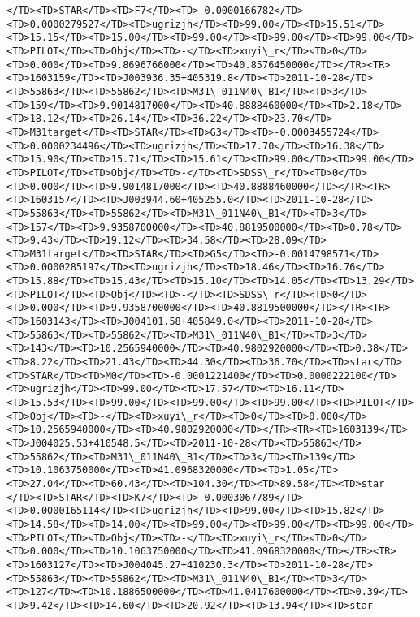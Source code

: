 \documentclass[11pt]{article}
\begin{document}
\begin{Verbatim}[commandchars=\\\{\}]
</TD><TD>STAR</TD><TD>F7</TD><TD>-0.0000166782</TD><TD>0.0000279527</TD><TD>ugrizjh</TD><TD>99.00</TD><TD>15.51</TD><TD>15.15</TD><TD>15.00</TD><TD>99.00</TD><TD>99.00</TD><TD>99.00</TD><TD>PILOT</TD><TD>Obj</TD><TD>-</TD><TD>xuyi\_r</TD><TD>0</TD><TD>0.000</TD><TD>9.8696766000</TD><TD>40.8576450000</TD></TR><TR><TD>1603159</TD><TD>J003936.35+405319.8</TD><TD>2011-10-28</TD><TD>55863</TD><TD>55862</TD><TD>M31\_011N40\_B1</TD><TD>3</TD><TD>159</TD><TD>9.9014817000</TD><TD>40.8888460000</TD><TD>2.18</TD><TD>18.12</TD><TD>26.14</TD><TD>36.22</TD><TD>23.70</TD><TD>M31target</TD><TD>STAR</TD><TD>G3</TD><TD>-0.0003455724</TD><TD>0.0000234496</TD><TD>ugrizjh</TD><TD>17.70</TD><TD>16.38</TD><TD>15.90</TD><TD>15.71</TD><TD>15.61</TD><TD>99.00</TD><TD>99.00</TD><TD>PILOT</TD><TD>Obj</TD><TD>-</TD><TD>SDSS\_r</TD><TD>0</TD><TD>0.000</TD><TD>9.9014817000</TD><TD>40.8888460000</TD></TR><TR><TD>1603157</TD><TD>J003944.60+405255.0</TD><TD>2011-10-28</TD><TD>55863</TD><TD>55862</TD><TD>M31\_011N40\_B1</TD><TD>3</TD><TD>157</TD><TD>9.9358700000</TD><TD>40.8819500000</TD><TD>0.78</TD><TD>9.43</TD><TD>19.12</TD><TD>34.58</TD><TD>28.09</TD><TD>M31target</TD><TD>STAR</TD><TD>G5</TD><TD>-0.0014798571</TD><TD>0.0000285197</TD><TD>ugrizjh</TD><TD>18.46</TD><TD>16.76</TD><TD>15.88</TD><TD>15.43</TD><TD>15.10</TD><TD>14.05</TD><TD>13.29</TD><TD>PILOT</TD><TD>Obj</TD><TD>-</TD><TD>SDSS\_r</TD><TD>0</TD><TD>0.000</TD><TD>9.9358700000</TD><TD>40.8819500000</TD></TR><TR><TD>1603143</TD><TD>J004101.58+405849.0</TD><TD>2011-10-28</TD><TD>55863</TD><TD>55862</TD><TD>M31\_011N40\_B1</TD><TD>3</TD><TD>143</TD><TD>10.2565940000</TD><TD>40.9802920000</TD><TD>0.38</TD><TD>8.22</TD><TD>21.43</TD><TD>44.30</TD><TD>36.70</TD><TD>star</TD><TD>STAR</TD><TD>M0</TD><TD>-0.0001221400</TD><TD>0.0000222100</TD><TD>ugrizjh</TD><TD>99.00</TD><TD>17.57</TD><TD>16.11</TD><TD>15.53</TD><TD>99.00</TD><TD>99.00</TD><TD>99.00</TD><TD>PILOT</TD><TD>Obj</TD><TD>-</TD><TD>xuyi\_r</TD><TD>0</TD><TD>0.000</TD><TD>10.2565940000</TD><TD>40.9802920000</TD></TR><TR><TD>1603139</TD><TD>J004025.53+410548.5</TD><TD>2011-10-28</TD><TD>55863</TD><TD>55862</TD><TD>M31\_011N40\_B1</TD><TD>3</TD><TD>139</TD><TD>10.1063750000</TD><TD>41.0968320000</TD><TD>1.05</TD><TD>27.04</TD><TD>60.43</TD><TD>104.30</TD><TD>89.58</TD><TD>star     </TD><TD>STAR</TD><TD>K7</TD><TD>-0.0003067789</TD><TD>0.0000165114</TD><TD>ugrizjh</TD><TD>99.00</TD><TD>15.82</TD><TD>14.58</TD><TD>14.00</TD><TD>99.00</TD><TD>99.00</TD><TD>99.00</TD><TD>PILOT</TD><TD>Obj</TD><TD>-</TD><TD>xuyi\_r</TD><TD>0</TD><TD>0.000</TD><TD>10.1063750000</TD><TD>41.0968320000</TD></TR><TR><TD>1603127</TD><TD>J004045.27+410230.3</TD><TD>2011-10-28</TD><TD>55863</TD><TD>55862</TD><TD>M31\_011N40\_B1</TD><TD>3</TD><TD>127</TD><TD>10.1886500000</TD><TD>41.0417600000</TD><TD>0.39</TD><TD>9.42</TD><TD>14.60</TD><TD>20.92</TD><TD>13.94</TD><TD>star     
\end{Verbatim}
\end{document}
